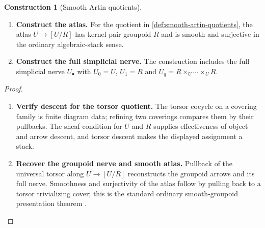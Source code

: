 \documentclass[11pt,a4paper]{article}
\numberwithin{algorithm}{section}
\numberwithin{equation}{section}
\theoremstyle{definition}
\theoremstyle{remark}
\theoremstyle{plain}
\theoremstyle{definition}
\newtheorem{construction}[construction]{Construction}
\theoremstyle{plain}
\begin{document}
\begin{construction}[Smooth Artin quotients]
\label{constr:artin-quotient}\leavevmode
\begin{enumerate}[leftmargin=*,align=left]
\item \textbf{Construct the atlas.}
For the quotient in \cref{def:smooth-artin-quotients}, the atlas $U\to[U/R]$
has kernel-pair groupoid $R$ and is smooth and surjective in
the ordinary algebraic-stack sense.

\item \textbf{Construct the full simplicial nerve.}
The construction includes
the full simplicial nerve $U_\bullet$ with
$U_0=U$, $U_1=R$ and $U_q=R\times_U\cdots\times_U R$.
\end{enumerate}
\end{construction}
\begin{proof}\leavevmode
\begin{enumerate}[leftmargin=*,align=left]
\item \textbf{Verify descent for the torsor quotient.}
The torsor cocycle on a covering family is finite diagram data;
refining two coverings compares them by their pullbacks.
The sheaf condition for $U$ and $R$ supplies effectiveness of
object and arrow descent, and torsor descent makes the
displayed assignment a stack.

\item \textbf{Recover the groupoid nerve and smooth atlas.}
Pullback of the universal
torsor along $U\to[U/R]$ reconstructs the groupoid arrows
and its full nerve.  Smoothness and surjectivity of the atlas
follow by pulling back to a torsor trivializing cover; this
is the standard ordinary smooth-groupoid presentation theorem
\citep[Sections 94.12 and 94.17]{StacksArtin}.
\end{enumerate}
\end{proof}
\end{document}
